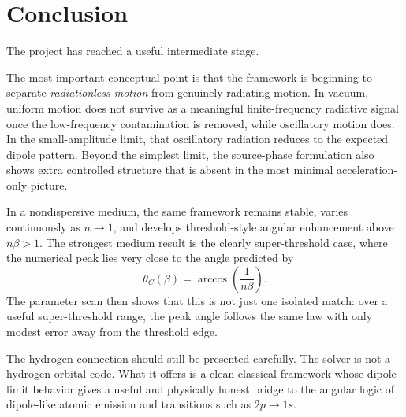\documentclass[11pt]{article}
\begin{document}
\section{Conclusion}

The project has reached a useful intermediate stage.

The most important conceptual point is that the framework is beginning to separate \emph{radiationless motion} from genuinely radiating motion. In vacuum, uniform motion does not survive as a meaningful finite-frequency radiative signal once the low-frequency contamination is removed, while oscillatory motion does. In the small-amplitude limit, that oscillatory radiation reduces to the expected dipole pattern. Beyond the simplest limit, the source-phase formulation also shows extra controlled structure that is absent in the most minimal acceleration-only picture.

In a nondispersive medium, the same framework remains stable, varies continuously as $n\to1$, and develops threshold-style angular enhancement above $n\beta>1$. The strongest medium result is the clearly super-threshold case, where the numerical peak lies very close to the angle predicted by
\[
\theta_C(\beta)=\arccos\!\left(\frac{1}{n\beta}\right).
\]
The parameter scan then shows that this is not just one isolated match: over a useful super-threshold range, the peak angle follows the same law with only modest error away from the threshold edge.

The hydrogen connection should still be presented carefully. The solver is not a hydrogen-orbital code. What it offers is a clean classical framework whose dipole-limit behavior gives a useful and physically honest bridge to the angular logic of dipole-like atomic emission and transitions such as $2p\to1s$.
\end{document}
